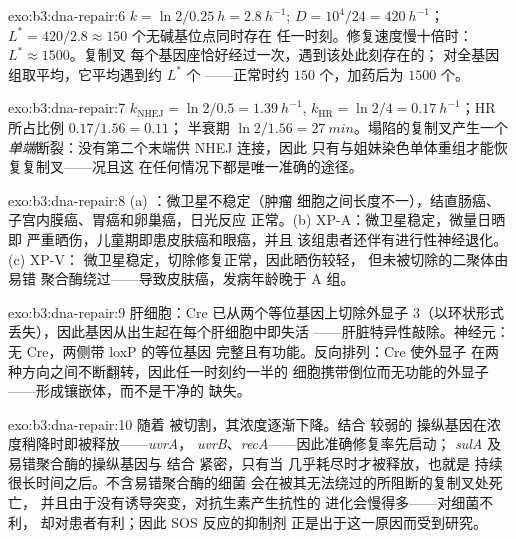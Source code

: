 \begin{solution}{exo:b3:dna-repair:6}
$k = \ln 2/\qty{0.25}{h} = \qty{2.8}{h^{-1}}$; $D = 10^{4}/24 =
\qty{420}{h^{-1}}$；$L^{*} = 420/2.8 \approx 150$ 个无碱基位点同时存在
任一时刻。修复速度慢十倍时：$L^{*} \approx \num{1500}$。复制叉
每个基因座恰好经过一次，遇到该处此刻存在的；
对全基因组取平均，它平均遇到约 $L^{*}$ 个
——正常时约 $150$ 个，加药后为 $\num{1500}$ 个。
\end{solution}

\begin{solution}{exo:b3:dna-repair:7}
$k_{\text{NHEJ}} = \ln 2/0.5 = \qty{1.39}{h^{-1}}$, $k_{\text{HR}} =
\ln 2/4 = \qty{0.17}{h^{-1}}$；HR 所占比例 $0.17/1.56 = 0.11$；
半衰期 $\ln 2/1.56 = \qty{27}{min}$。塌陷的复制叉产生一个
\emph{单端}断裂：没有第二个末端供 NHEJ 连接，因此
只有与姐妹染色单体重组才能恢复复制叉——况且这
在任何情况下都是唯一准确的途径。
\end{solution}

\begin{solution}{exo:b3:dna-repair:8}
(a) ：微卫星不稳定（肿瘤
细胞之间长度不一），结直肠癌、子宫内膜癌、胃癌和卵巢癌，日光反应
正常。(b) XP-A：微卫星稳定，微量日晒即
严重晒伤，儿童期即患皮肤癌和眼癌，并且
该组患者还伴有进行性神经退化。(c) XP-V：
微卫星稳定，切除修复正常，因此晒伤较轻，
但未被切除的二聚体由易错
聚合酶绕过——导致皮肤癌，发病年龄晚于 A 组。
\end{solution}

\begin{solution}{exo:b3:dna-repair:9}
肝细胞：Cre 已从两个等位基因上切除外显子 3（以环状形式
丢失），因此基因从出生起在每个肝细胞中即失活
——肝脏特异性敲除。神经元：无 Cre，两侧带 loxP 的等位基因
完整且有功能。反向排列：Cre 使外显子
在两种方向之间不断翻转，因此任一时刻约一半的
细胞携带倒位而无功能的外显子——形成镶嵌体，而不是干净的
缺失。
\end{solution}

\begin{solution}{exo:b3:dna-repair:10}
随着  被切割，其浓度逐渐下降。结合  较弱的
操纵基因在浓度稍降时即被释放——\emph{uvrA}，
\emph{uvrB}、\emph{recA}——因此准确修复率先启动；
\emph{sulA} 及易错聚合酶的操纵基因与  结合
紧密，只有当  几乎耗尽时才被释放，也就是
持续很长时间之后。不含易错聚合酶的细菌
会在被其无法绕过的所阻断的复制叉处死亡，
并且由于没有诱导突变，对抗生素产生抗性的
进化会慢得多——对细菌不利，
却对患者有利；因此 SOS 反应的抑制剂
正是出于这一原因而受到研究。
\end{solution}

